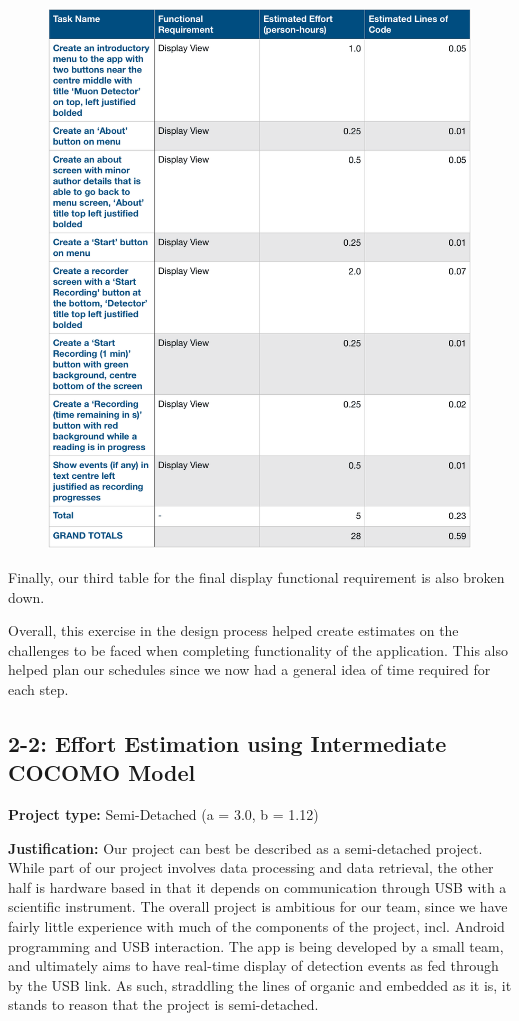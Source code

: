 \documentclass[11pt,a4paper]{article}
\begin{document}
\newpage
\begin{figure}[h]
  \centering
      \includegraphics[width=1.0\textwidth]{displaytable4.png}  
\end{figure}

Finally, our third table for the final display functional requirement is also broken down. 

Overall, this exercise in the design process helped create estimates on the challenges to be faced when completing functionality of the application. This also helped plan our schedules since we now had a general idea of time required for each step. 

\newpage
\subsection*{2-2: Effort Estimation using Intermediate COCOMO Model}

\textbf{Project type:} Semi-Detached (a = 3.0, b = 1.12)

\textbf{Justification:} Our project can best be described as a semi-detached project. While part of our project involves data processing and data retrieval, the other half is hardware based in that it depends on communication through USB with a scientific instrument. The overall project is ambitious for our team, since we have fairly little experience with much of the components of the project, incl. Android programming and USB interaction. The app is being developed by a small team, and ultimately aims to have real-time display of detection events as fed through by the USB link. As such, straddling the lines of organic and embedded as it is, it stands to reason that the project is semi-detached.
\end{document}
